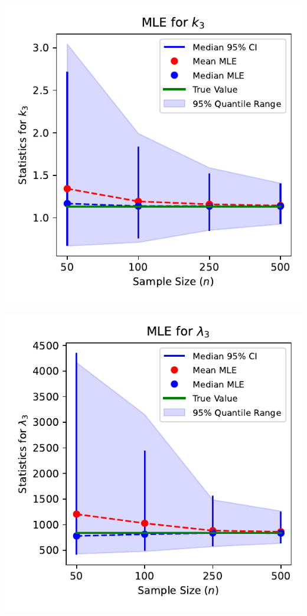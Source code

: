 \documentclass{article}
\begin{document}

\noindent
\begin{minipage}[t]{0.475\textwidth}
  \centering
  \includegraphics[width=\textwidth,height=0.33\textheight,keepaspectratio]{plot-n-vs-shape.3-mle.pdf}
\end{minipage}%
\begin{minipage}[t]{0.475\textwidth}
  \centering
  \includegraphics[width=\textwidth,height=0.33\textheight,keepaspectratio]{plot-n-vs-scale.3-mle.pdf}
\end{minipage}
\end{document}
